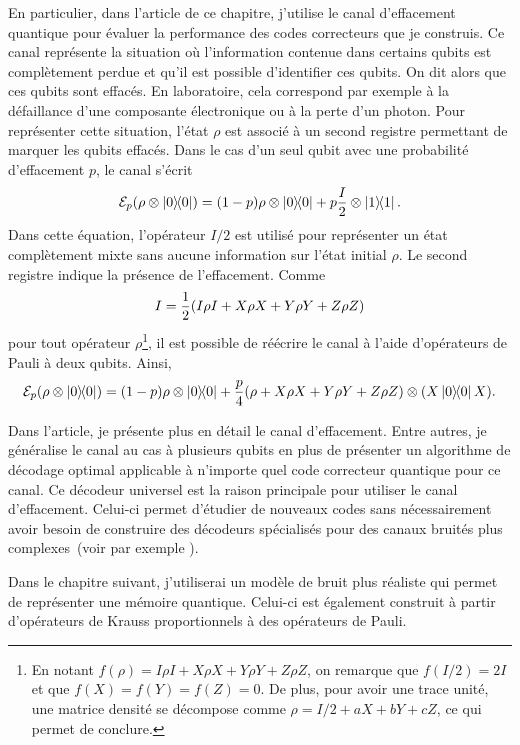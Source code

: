 En particulier,
dans l'article de ce chapitre,
j'utilise le canal d'effacement quantique pour évaluer la performance
des codes correcteurs que je construis.
Ce canal représente la situation où l'information contenue dans certains qubits
est complètement perdue et qu'il est possible d'identifier ces qubits.
On dit alors que ces qubits sont effacés.
En laboratoire, cela correspond par exemple à la défaillance d'une composante électronique
ou à la perte d'un photon.
Pour représenter cette situation, l'état $\rho$ est associé à un second registre
permettant de marquer les qubits effacés.
Dans le cas d'un seul qubit avec une probabilité d'effacement $p$,
le canal s'écrit
\begin{equation}
  \mathcal E_p(\rho \otimes \op{0}) 
  = (1 - p) \rho \otimes \op{0} + p \frac{I}{2} \otimes \op{1}.
\end{equation}
Dans cette équation,
l'opérateur $I/2$ est utilisé pour représenter un état complètement mixte
sans aucune information sur l'état initial $\rho$.
Le second registre indique la présence de l'effacement.
Comme 
\begin{align}
  I = \frac{1}{2} \qty(
  I\rho I + X \rho X + Y \rho Y + Z \rho Z
)
\end{align}
pour tout opérateur $\rho$\footnote{
  En notant $f(\rho) = I\rho I + X\rho X + Y \rho Y + Z \rho Z$,
  on remarque que $f(I/2) = 2I$ et que $f(X) = f(Y) = f(Z) = 0$.
  De plus,
  pour avoir une trace unité,
  une matrice densité se décompose comme $\rho = I/2 + aX + bY + cZ$,
  ce qui permet de conclure.
},
il est possible de réécrire le canal à l'aide d'opérateurs de Pauli à deux qubits.
Ainsi,
\begin{equation}
  \mathcal E_p(\rho \otimes \op{0}) 
  = \qty(1 -  p) \rho \otimes \op{0} + \frac{p}{4} \qty(\rho + X \rho X + Y \rho Y + Z \rho Z)\otimes \qty(X\op{0}X).
\end{equation}

Dans l'article,
je présente plus en détail le canal d'effacement.
Entre autres,
je généralise le canal au cas à plusieurs qubits
en plus de présenter un algorithme de décodage optimal applicable à n'importe quel
code correcteur quantique pour ce canal.
Ce décodeur universel est la raison principale pour utiliser le canal d'effacement.
Celui-ci permet d'étudier de nouveaux codes sans nécessairement avoir besoin de construire des 
décodeurs spécialisés pour des canaux bruités plus complexes~(voir par exemple \cite{pastawski_holographic_2015, gullans_quantum_2021}).

Dans le chapitre suivant,
j'utiliserai un modèle de bruit plus réaliste qui permet
de représenter une mémoire quantique.
Celui-ci est également construit à partir d'opérateurs de Krauss proportionnels à des
opérateurs de Pauli.

